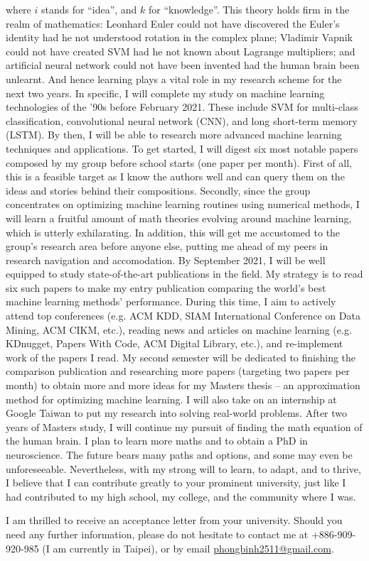 \documentclass[letterpaper,12pt]{article}
\begin{document}
where \(i\) stands for ``idea'', and \(k\) for ``knowledge''. This theory holds firm in the realm of mathematics: Leonhard Euler could not have discovered the Euler's identity had he not understood rotation in the complex plane; Vladimir Vapnik could not have created SVM had he not known about Lagrange multipliers; and artificial neural network could not have been invented had the human brain been unlearnt. And hence learning plays a vital role in my research scheme for the next two years. In specific, I will complete my study on machine learning technologies of the '90s before February 2021. These include SVM for multi-class classification, convolutional neural network (CNN), and long short-term memory (LSTM). By then, I will be able to research more advanced machine learning techniques and applications. To get started, I will digest six most notable papers composed by my group before school starts (one paper per month). First of all, this is a feasible target as I know the authors well and can query them on the ideas and stories behind their compositions. Secondly, since the group concentrates on optimizing machine learning routines using numerical methods, I will learn a fruitful amount of math theories evolving around machine learning, which is utterly exhilarating. In addition, this will get me accustomed to the group's research area before anyone else, putting me ahead of my peers in research navigation and accomodation. By September 2021, I will be well equipped to study state-of-the-art publications in the field. My strategy is to read six such papers to make my entry publication comparing the world's best machine learning methods' performance. During this time, I aim to actively attend top conferences (e.g. ACM KDD, SIAM International Conference on Data Mining, ACM CIKM, etc.), reading news and articles on machine learning (e.g. KDnugget, Papers With Code, ACM Digital Library, etc.), and re-implement work of the papers I read. My second semester will be dedicated to finishing the comparison publication and researching more papers (targeting two papers per month) to obtain more and more ideas for my Masters thesis -- an approximation method for optimizing machine learning. I will also take on an internship at Google Taiwan to put my research into solving real-world problems. After two years of Masters study, I will continue my pursuit of finding the math equation of the human brain. I plan to learn more maths and to obtain a PhD in neuroscience. The future bears many paths and options, and some may even be unforeseeable. Nevertheless, with my strong will to learn, to adapt, and to thrive, I believe that I can contribute greatly to your prominent university, just like I had contributed to my high school, my college, and the community where I was.

I am thrilled to receive an acceptance letter from your university. Should you need any further information, please do not hesitate to contact me at +886-909-920-985 (I am currently in Taipei), or by email \href{mailto:phongbinh2511@gmail.com}{phongbinh2511@gmail.com}.
\end{document}
